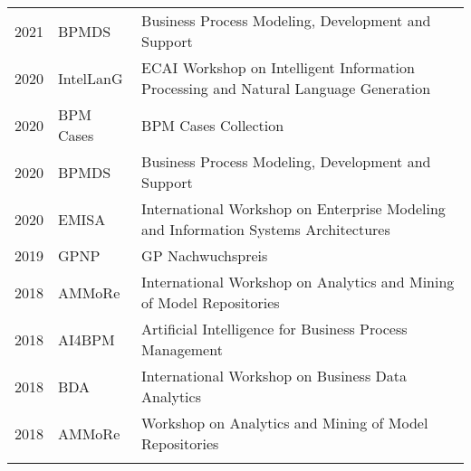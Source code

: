 \vspace{0.5cm}
\vspace{0.3cm}

\raggedright
\begin{tabular}{P{2.5cm}P{2cm}P{11cm}}
2021												& BPMDS		& Business Process Modeling, Development and Support\\\noalign{\smallskip}
2020												& IntelLanG 	& ECAI Workshop on Intelligent Information Processing and Natural Language Generation \\\noalign{\smallskip}
2020												& BPM Cases& BPM Cases Collection \\\noalign{\smallskip}
2020												& BPMDS		& Business Process Modeling, Development and Support\\\noalign{\smallskip}
2020												& EMISA		& International Workshop on Enterprise Modeling and Information Systems Architectures \\\noalign{\smallskip}
2019												& GPNP			& GP Nachwuchspreis \\\noalign{\smallskip}
2018												& AMMoRe	& International Workshop on Analytics and Mining of Model Repositories\\\noalign{\smallskip}
2018												& AI4BPM	 	& Artificial Intelligence for Business Process Management \\\noalign{\smallskip}
2018												& BDA			& International Workshop on Business Data Analytics \\\noalign{\smallskip}
2018												& AMMoRe	& Workshop on Analytics and Mining of Model Repositories \\\noalign{\smallskip}
\end{tabular}
\raggedright
